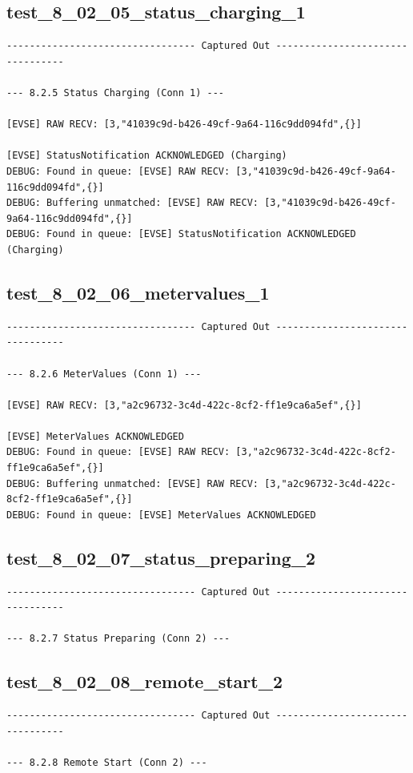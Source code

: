 \documentclass{article}
\begin{document}
\subsection*{test\_8\_02\_05\_status\_charging\_1}
\begin{lstlisting}
--------------------------------- Captured Out ---------------------------------

--- 8.2.5 Status Charging (Conn 1) ---

[EVSE] RAW RECV: [3,"41039c9d-b426-49cf-9a64-116c9dd094fd",{}]

[EVSE] StatusNotification ACKNOWLEDGED (Charging)
DEBUG: Found in queue: [EVSE] RAW RECV: [3,"41039c9d-b426-49cf-9a64-116c9dd094fd",{}]
DEBUG: Buffering unmatched: [EVSE] RAW RECV: [3,"41039c9d-b426-49cf-9a64-116c9dd094fd",{}]
DEBUG: Found in queue: [EVSE] StatusNotification ACKNOWLEDGED (Charging)
\end{lstlisting}
\subsection*{test\_8\_02\_06\_metervalues\_1}
\begin{lstlisting}
--------------------------------- Captured Out ---------------------------------

--- 8.2.6 MeterValues (Conn 1) ---

[EVSE] RAW RECV: [3,"a2c96732-3c4d-422c-8cf2-ff1e9ca6a5ef",{}]

[EVSE] MeterValues ACKNOWLEDGED
DEBUG: Found in queue: [EVSE] RAW RECV: [3,"a2c96732-3c4d-422c-8cf2-ff1e9ca6a5ef",{}]
DEBUG: Buffering unmatched: [EVSE] RAW RECV: [3,"a2c96732-3c4d-422c-8cf2-ff1e9ca6a5ef",{}]
DEBUG: Found in queue: [EVSE] MeterValues ACKNOWLEDGED
\end{lstlisting}
\subsection*{test\_8\_02\_07\_status\_preparing\_2}
\begin{lstlisting}
--------------------------------- Captured Out ---------------------------------

--- 8.2.7 Status Preparing (Conn 2) ---
\end{lstlisting}
\subsection*{test\_8\_02\_08\_remote\_start\_2}
\begin{lstlisting}
--------------------------------- Captured Out ---------------------------------

--- 8.2.8 Remote Start (Conn 2) ---
\end{lstlisting}
\end{document}
